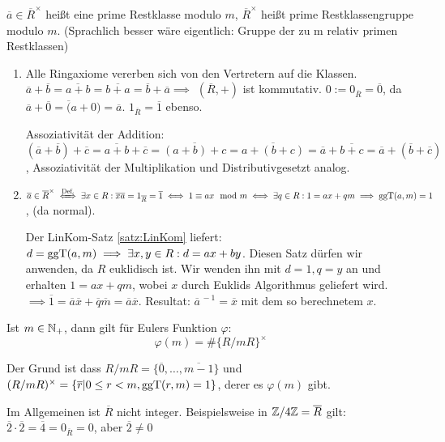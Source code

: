 \documentclass[a4paper,twoside,DIV15,BCOR12mm]{scrbook}
\begin{document}
\begin{definition}
$\overline a \in \overline R^\times$ heißt eine prime Restklasse
modulo $m$, $\overline R^\times$ heißt prime Restklassengruppe
modulo $m$. (Sprachlich besser wäre eigentlich: Gruppe der zu m
relativ primen Restklassen)
\end{definition}

\begin{beweis}
\begin{enumerate}
\item Alle Ringaxiome vererben sich von den Vertretern auf die Klassen. $\overline a + \overline b = \overline {a+b} = \overline {b+a} = \overline b + \overline a \implies$ $(\overline R,+)$ ist kommutativ. $0 := 0_{\overline R} = \overline 0$, da $\overline a + \overline 0 = \overline (a+0) = \overline a$. $1_{\overline R} = \overline 1$ ebenso.

Assoziativität der Addition: $(\overline a+ \overline b) + \overline
c = \overline {a+b} + \overline c = \overline {(a+b) +c } =
\overline {a + (b+c)} = \overline a + \overline {b+c} = \overline a
+ (\overline b + \overline c)$, Assoziativität der Multiplikation
und Distributivgesetzt analog.
\item $\overline a \in \overline R^\times \equizunach{Def.} \exists x \in R: \overline x \overline a = 1_{\overline R} = \overline 1 \iff 1 \equiv ax \mod m \iff \exists q \in R: 1 =ax + qm \implies \ggt(a,m)=1$, (da normal).

Der LinKom-Satz \ref{satz:LinKom} liefert: $d=\mathop{\rm ggT}\nolimits(a,m) \implies
\exists x,y\in R: d=ax+by$. Diesen Satz dürfen wir anwenden, da $R$
euklidisch ist. Wir wenden ihn mit $d=1, q=y$ an und erhalten
$1=ax+qm$, wobei $x$ durch Euklids Algorithmus geliefert wird.
$\implies \overline 1 = \overline a \overline x + \overline q
\overline m = \overline a \overline x$. Resultat: $\overline a
^{\,-1} = \overline x$ mit dem so berechnetem $x$.
\end{enumerate}
\end{beweis}

\begin{folgerung}
Ist $m\in \mathbb{N}_+$, dann gilt für Eulers Funktion $\varphi$:
\[ \varphi(m) = \#\{R/mR\}^\times \]
\end{folgerung}

Der Grund ist dass $R/mR = \{\overline 0, \ldots, \overline {m-1}\}$
und $(R/mR)^\times = \{\overline r | 0 \le r < m, \mathop{\rm ggT}\nolimits(r,m)=1\}$,
derer es $\varphi(m)$ gibt.

Im Allgemeinen ist $\overline R$ nicht integer. Beispielsweise in
$\mathbb{Z}/4\mathbb{Z}=\overline R$ gilt: $\overline 2 \cdot \overline 2 =
\overline 4 = 0_{\overline R} = 0$, aber $\overline 2 \ne 0$
\end{document}
